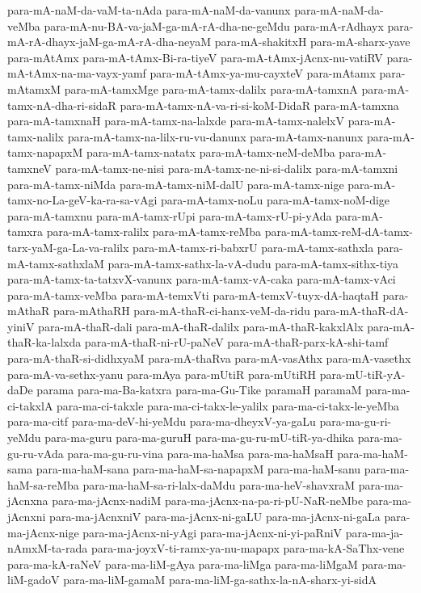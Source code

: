 {para-mA-naM-da-vaM-ta-nAda
para-mA-naM-da-vanunx
para-mA-naM-da-veMba
para-mA-nu-BA-va-jaM-ga-mA-rA-dha-ne-geMdu
para-mA-rAdhayx
para-mA-rA-dhayx-jaM-ga-mA-rA-dha-neyaM
para-mA-shakitxH
para-mA-sharx-yave
para-mAtAmx
para-mA-tAmx-Bi-ra-tiyeV
para-mA-tAmx-jAcnx-nu-vatiRV
para-mA-tAmx-na-ma-vayx-yamf
para-mA-tAmx-ya-mu-cayxteV
para-mAtamx
para-mAtamxM
para-mA-tamxMge
para-mA-tamx-dalilx
para-mA-tamxnA
para-mA-tamx-nA-dha-ri-sidaR
para-mA-tamx-nA-va-ri-si-koM-DidaR
para-mA-tamxna
para-mA-tamxnaH
para-mA-tamx-na-lalxde
para-mA-tamx-nalelxV
para-mA-tamx-nalilx
para-mA-tamx-na-lilx-ru-vu-danunx
para-mA-tamx-nanunx
para-mA-tamx-napapxM
para-mA-tamx-natatx
para-mA-tamx-neM-deMba
para-mA-tamxneV
para-mA-tamx-ne-nisi
para-mA-tamx-ne-ni-si-dalilx
para-mA-tamxni
para-mA-tamx-niMda
para-mA-tamx-niM-dalU
para-mA-tamx-nige
para-mA-tamx-no-La-geV-ka-ra-sa-vAgi
para-mA-tamx-noLu
para-mA-tamx-noM-dige
para-mA-tamxnu
para-mA-tamx-rUpi
para-mA-tamx-rU-pi-yAda
para-mA-tamxra
para-mA-tamx-ralilx
para-mA-tamx-reMba
para-mA-tamx-reM-dA-tamx-tarx-yaM-ga-La-va-ralilx
para-mA-tamx-ri-babxrU
para-mA-tamx-sathxla
para-mA-tamx-sathxlaM
para-mA-tamx-sathx-la-vA-dudu
para-mA-tamx-sithx-tiya
para-mA-tamx-ta-tatxvX-vanunx
para-mA-tamx-vA-caka
para-mA-tamx-vAci
para-mA-tamx-veMba
para-mA-temxVti
para-mA-temxV-tuyx-dA-haqtaH
para-mAthaR
para-mAthaRH
para-mA-thaR-ci-hanx-veM-da-ridu
para-mA-thaR-dA-yiniV
para-mA-thaR-dali
para-mA-thaR-dalilx
para-mA-thaR-kakxlAlx
para-mA-thaR-ka-lalxda
para-mA-thaR-ni-rU-paNeV
para-mA-thaR-parx-kA-shi-tamf
para-mA-thaR-si-didhxyaM
para-mA-thaRva
para-mA-vasAthx
para-mA-vasethx
para-mA-va-sethx-yanu
para-mAya
para-mUtiR
para-mUtiRH
para-mU-tiR-yA-daDe
parama
para-ma-Ba-katxra
para-ma-Gu-Tike
paramaH
paramaM
para-ma-ci-takxlA
para-ma-ci-takxle
para-ma-ci-takx-le-yalilx
para-ma-ci-takx-le-yeMba
para-ma-citf
para-ma-deV-hi-yeMdu
para-ma-dheyxV-ya-gaLu
para-ma-gu-ri-yeMdu
para-ma-guru
para-ma-guruH
para-ma-gu-ru-mU-tiR-ya-dhika
para-ma-gu-ru-vAda
para-ma-gu-ru-vina
para-ma-haMsa
para-ma-haMsaH
para-ma-haM-sama
para-ma-haM-sana
para-ma-haM-sa-napapxM
para-ma-haM-sanu
para-ma-haM-sa-reMba
para-ma-haM-sa-ri-lalx-daMdu
para-ma-heV-shavxraM
para-ma-jAcnxna
para-ma-jAcnx-nadiM
para-ma-jAcnx-na-pa-ri-pU-NaR-neMbe
para-ma-jAcnxni
para-ma-jAcnxniV
para-ma-jAcnx-ni-gaLU
para-ma-jAcnx-ni-gaLa
para-ma-jAcnx-nige
para-ma-jAcnx-ni-yAgi
para-ma-jAcnx-ni-yi-paRniV
para-ma-ja-nAmxM-ta-rada
para-ma-joyxV-ti-ramx-ya-nu-mapapx
para-ma-kA-SaThx-vene
para-ma-kA-raNeV
para-ma-liM-gAya
para-ma-liMga
para-ma-liMgaM
para-ma-liM-gadoV
para-ma-liM-gamaM
para-ma-liM-ga-sathx-la-nA-sharx-yi-sidA
}
